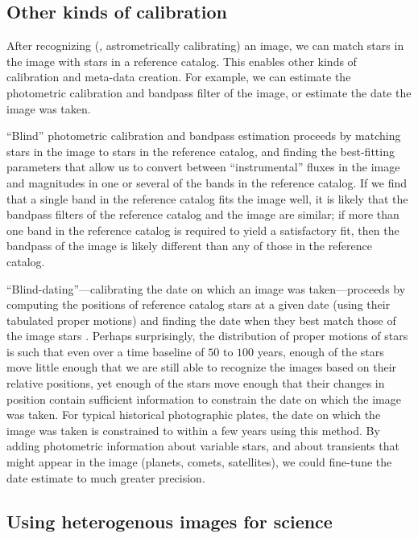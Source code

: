 
\subsection{Other kinds of calibration}


After recognizing (\ie, astrometrically calibrating) an image, we can
match stars in the image with stars in a reference catalog.  This
enables other kinds of calibration and meta-data creation.  For
example, we can estimate the photometric calibration and bandpass
filter of the image, or estimate the date the image was taken.


``Blind'' photometric calibration and bandpass estimation proceeds by
matching stars in the image to stars in the reference catalog, and
finding the best-fitting parameters that allow us to convert between
``instrumental'' fluxes in the image and magnitudes in one or several
of the bands in the reference catalog.  If we find that a single band
in the reference catalog fits the image well, it is likely that the
bandpass filters of the reference catalog and the image are similar;
if more than one band in the reference catalog is required to yield a
satisfactory fit, then the bandpass of the image is likely different
than any of those in the reference catalog.


``Blind-dating''---calibrating the date on which an image was
taken---proceeds by computing the positions of reference catalog stars
at a given date (using their tabulated proper motions) and finding the
date when they best match those of the image stars \cite{blinddate}.
Perhaps surprisingly, the distribution of proper motions of stars is
such that even over a time baseline of $50$ to $100$ years, enough of
the stars move little enough that we are still able to recognize the
images based on their relative positions, yet enough of the stars move
enough that their changes in position contain sufficient information
to constrain the date on which the image was taken.  For typical
historical photographic plates, the date on which the image was taken
is constrained to within a few years using this method.  By adding
photometric information about variable stars, and about transients
that might appear in the image (planets, comets, satellites), we could
fine-tune the date estimate to much greater precision.




\subsection{Using heterogenous images for science}


